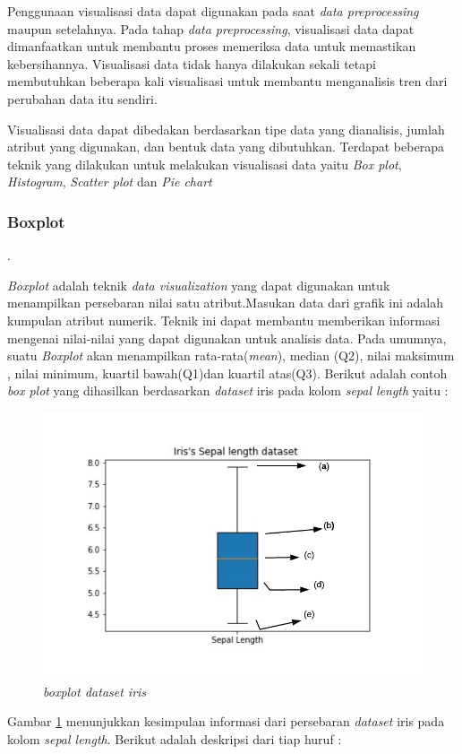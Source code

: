 \documentclass[a4paper,twoside]{article}
\begin{document}
\begin{enumerate}
Penggunaan visualisasi data dapat digunakan pada saat \textit{data preprocessing} maupun setelahnya. Pada tahap \textit{data preprocessing}, visualisasi data dapat dimanfaatkan untuk membantu proses memeriksa data untuk memastikan kebersihannya. Visualisasi data tidak hanya dilakukan sekali tetapi membutuhkan beberapa kali visualisasi untuk membantu menganalisis tren dari perubahan data itu sendiri. 
		
 Visualisasi data dapat dibedakan berdasarkan tipe data yang dianalisis, jumlah atribut yang digunakan, dan bentuk data yang dibutuhkan. Terdapat beberapa teknik yang dilakukan untuk melakukan visualisasi data yaitu \textit{Box plot}, \textit{Histogram}, \textit{Scatter plot} dan \textit{Pie chart} \\
\subsubsection{\textbf{Boxplot}}.
			
\textit{Boxplot} adalah teknik \textit{data visualization} yang dapat digunakan untuk menampilkan persebaran nilai satu atribut.Masukan data dari grafik ini adalah kumpulan atribut numerik. Teknik ini dapat membantu memberikan informasi mengenai nilai-nilai yang dapat digunakan untuk analisis data. Pada umumnya, suatu \textit{Boxplot} akan menampilkan rata-rata(\textit{mean}), median (Q2), nilai maksimum , nilai minimum, kuartil bawah(Q1)dan kuartil atas(Q3). Berikut adalah  contoh \textit{box plot} yang dihasilkan berdasarkan \textit{dataset} iris pada kolom \textit{sepal length} yaitu :
			
\begin{figure}[h!]
	\centering  
	\includegraphics[scale=0.7]{boxplot}   
	\caption{\textit{ boxplot dataset iris}}
	\label{fig:boxplot} 
\end{figure} 
 Gambar \ref{fig:boxplot} menunjukkan kesimpulan informasi dari persebaran \textit{dataset} iris pada kolom \textit{sepal length}. Berikut adalah deskripsi dari tiap huruf : 
	 	

\end{enumerate}
\end{document}
